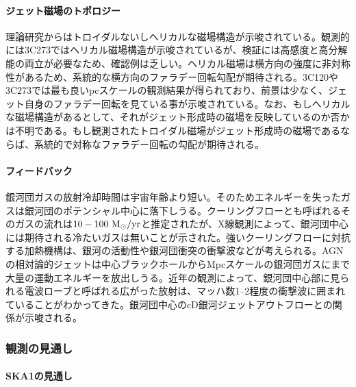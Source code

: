 \paragraph{ジェット磁場のトポロジー}

理論研究からはトロイダルないしヘリカルな磁場構造が示唆されている。観測的には3C273ではヘリカル磁場構造が示唆されているが、検証には高感度と高分解能の両立が必要なため、確認例は乏しい。ヘリカル磁場は横方向の強度に非対称性があるため、系統的な横方向のファラデー回転勾配が期待される。3C120や3C273では最も良いpcスケールの観測結果が得られており、前景は少なく、ジェット自身のファラデー回転を見ている事が示唆されている。なお、もしヘリカルな磁場構造があるとして、それがジェット形成時の磁場を反映しているのか否かは不明である。もし観測されたトロイダル磁場がジェット形成時の磁場であるならば、系統的で対称なファラデー回転の勾配が期待される。

\paragraph{フィードバック}

銀河団ガスの放射冷却時間は宇宙年齢より短い。そのためエネルギーを失ったガスは銀河団のポテンシャル中心に落下しうる。クーリングフローとも呼ばれるそのガスの流れは$10-100~{\rm M_{\odot}/yr}$と推定されたが、X線観測によって、銀河団中心には期待される冷たいガスは無いことが示された。強いクーリングフローに対抗する加熱機構は、銀河の活動性や銀河団衝突の衝撃波などが考えられる。AGNの相対論的ジェットは中心ブラックホールからMpcスケールの銀河団ガスにまで大量の運動エネルギーを放出しうる。近年の観測によって、銀河団中心部に見られる電波ローブと呼ばれる広がった放射は、マッハ数1--2程度の衝撃波に囲まれていることがわかってきた。銀河団中心のcD銀河ジェットアウトフローとの関係が示唆される。

\subsubsection{観測の見通し}
\label{c06.s2.ss4.sss2}

\paragraph{SKA1の見通し}

